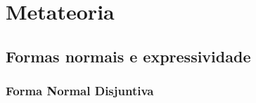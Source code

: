 \part{Metateoria}
\label{ch.normalform}

\chapter{Formas normais e expressividade}


\section{Forma Normal Disjuntiva}\label{s:DNFDefined}

